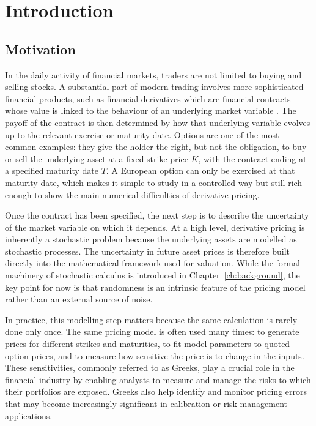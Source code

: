 \chapter{Introduction}
\label{ch:introduction}

\section{Motivation}

In the daily activity of financial markets, traders are not limited to buying and selling stocks. A substantial part of modern trading involves more sophisticated financial products, such as financial derivatives which are financial contracts whose value is linked to the behaviour of an underlying market variable \cite{hull_options}. 
The payoff of the contract is then determined by how that underlying variable evolves up to the relevant exercise or maturity date.
Options are one of the most common examples: they give the holder the right, but not the obligation, to buy or sell the underlying asset at a fixed strike price \(K\), with the contract ending at a specified maturity date \(T\). 
A European option can only be exercised at that maturity date, which makes it simple to study in a controlled way but still rich enough to show the main numerical difficulties of derivative pricing.

Once the contract has been specified, the next step is to describe the uncertainty of the market variable on which it depends. At a high level, derivative pricing is inherently a stochastic problem because the underlying assets are modelled as stochastic processes.
The uncertainty in future asset prices is therefore built directly into the mathematical framework used for valuation. 
While the formal machinery of stochastic calculus is introduced in Chapter~\ref{ch:background}, the key point for now is that randomness is an intrinsic feature of the pricing model rather than an external source of noise.


In practice, this modelling step matters because the same calculation is rarely done only once. 
The same pricing model is often used many times: to generate prices for different strikes and maturities, to fit model parameters to quoted option prices, and to measure how sensitive the price is to change in the inputs. 
These sensitivities, commonly referred to as Greeks, play a crucial role in the financial industry by enabling analysts to measure and manage the risks to which their portfolios are exposed. 
Greeks also help identify and monitor pricing errors that may become increasingly significant in calibration or risk-management applications.

